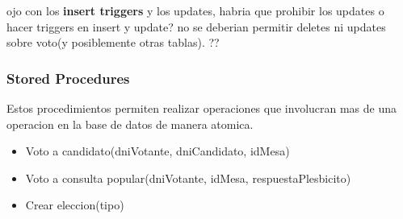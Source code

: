 ojo con los \textbf{insert triggers} y los updates, habria que prohibir los updates o hacer triggers en insert y update?
no se deberian permitir deletes ni updates sobre voto(y posiblemente otras tablas). ??

\subsubsection{Stored Procedures}
Estos procedimientos permiten realizar operaciones que involucran mas de una operacion en la base de datos de manera atomica.
\begin{itemize}
	\item Voto a candidato(dniVotante, dniCandidato, idMesa)
	\item Voto a consulta popular(dniVotante, idMesa, respuestaPlesbicito)
	\item Crear eleccion(tipo)
\end{itemize}